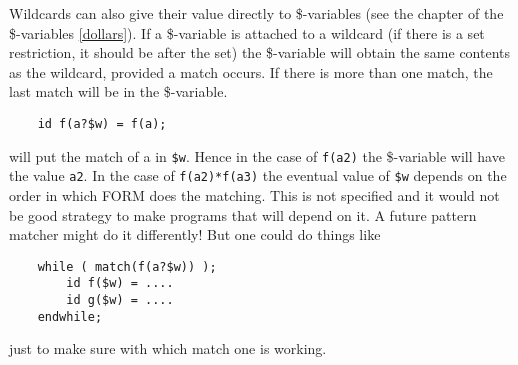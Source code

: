 Wildcards can also give their value directly to 
\$-variables (see the chapter of the \$-variables 
\ref{dollars}). If a \$-variable is attached to a wildcard (if there is a 
set restriction, it should be after the set) the \$-variable will obtain 
the same contents as the wildcard, provided a match occurs. If there is 
more than one match, the last match will be in the \$-variable.
\begin{verbatim}
    id f(a?$w) = f(a);
\end{verbatim}
will put the match of a in \verb:$w:. Hence in the case of \verb:f(a2): the 
\$-variable will have the value \verb:a2:. In the case of 
\verb:f(a2)*f(a3): the eventual value of \verb:$w: depends on the order in 
which FORM does the matching. This is not specified and it would not be 
good strategy to make programs that will depend on it. A future pattern 
matcher might do it differently! But one could do things like
\begin{verbatim}
    while ( match(f(a?$w)) );
        id f($w) = ....
        id g($w) = ....
    endwhile;
\end{verbatim}
just to make sure with which match one is working.

